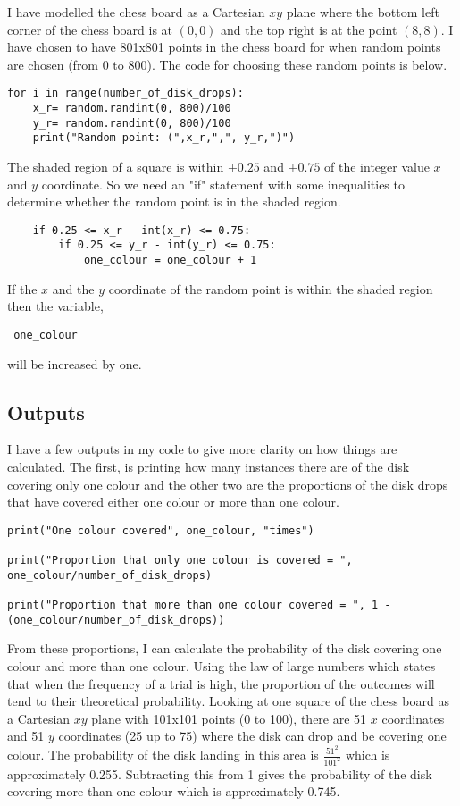 \documentclass[11pt,a4paper]{amsart}
\theoremstyle{plain}
\theoremstyle{definition}
\theoremstyle{remark}
\begin{document}
I have modelled the chess board as a Cartesian $xy$ plane where the bottom left corner of the chess board is at $(0, 0)$ and the top right is at the point $(8, 8)$. I have chosen to have 801x801 points in the chess board for when random points are chosen (from 0 to 800). The code for choosing these random points is below. 
\begin{lstlisting}
for i in range(number_of_disk_drops):
    x_r= random.randint(0, 800)/100
    y_r= random.randint(0, 800)/100
    print("Random point: (",x_r,",", y_r,")")
\end{lstlisting}
The shaded region of a square is within $+0.25$ and $+0.75$ of the integer value $x$ and $y$ coordinate. So we need an "if" statement with some inequalities to determine whether the random point is in the shaded region.
\begin{lstlisting}
    if 0.25 <= x_r - int(x_r) <= 0.75:
        if 0.25 <= y_r - int(y_r) <= 0.75:
            one_colour = one_colour + 1
\end{lstlisting}
If the $x$ and the $y$ coordinate of the random point is within the shaded region then the variable, \begin{verbatim} one_colour \end{verbatim} will be increased by one.

\subsection{Outputs}

I have a few outputs in my code to give more clarity on how things are calculated. The first, is printing how many instances there are of the disk covering only one colour and the other two are the proportions of the disk drops that have covered either one colour or more than one colour.

\begin{lstlisting}
print("One colour covered", one_colour, "times")

print("Proportion that only one colour is covered = ", one_colour/number_of_disk_drops)

print("Proportion that more than one colour covered = ", 1 - (one_colour/number_of_disk_drops))
\end{lstlisting}

From these proportions, I can calculate the probability of the disk covering one colour and more than one colour. Using the law of large numbers which states that when the frequency of a trial is high, the proportion of the outcomes will tend to their theoretical probability. Looking at one square of the chess board as a Cartesian $xy$ plane with 101x101 points (0 to 100), there are 51 $x$ coordinates and 51 $y$ coordinates (25 up to 75) where the disk can drop and be covering one colour. The probability of the disk landing in this area is $\frac{51^2}{101^2}$ which is approximately 0.255. Subtracting this from 1 gives the probability of the disk covering more than one colour which is approximately 0.745.
\end{document}
